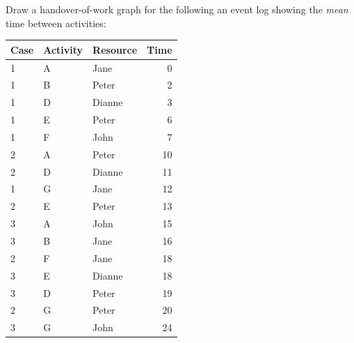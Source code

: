 \begin{exerciseboxpaper}
Draw a handover-of-work graph for the following an event log showing the \emph{mean} time between activities: \\ \bigskip

\renewcommand{\arraystretch}{1.25}
\begin{tabular}{l|l|l|r} \hline
{\bf Case} & {\bf Activity} & {\bf Resource} & {\bf Time} \\ \hline
1 & A & Jane & 0 \\
1 & B & Peter & 2 \\
1 & D & Dianne & 3 \\ 
1 & E & Peter & 6 \\ 
1 & F & John & 7 \\ 
2 & A & Peter & 10 \\
2 & D & Dianne & 11 \\
1 & G & Jane & 12 \\ 
2 & E & Peter & 13 \\ 
3 & A & John & 15 \\
3 & B & Jane & 16 \\
2 & F & Jane & 18 \\ 
3 & E & Dianne & 18 \\
3 & D & Peter & 19 \\
2 & G & Peter & 20 \\
3 & G & John & 24 \\
\end{tabular}
\end{exerciseboxpaper}

